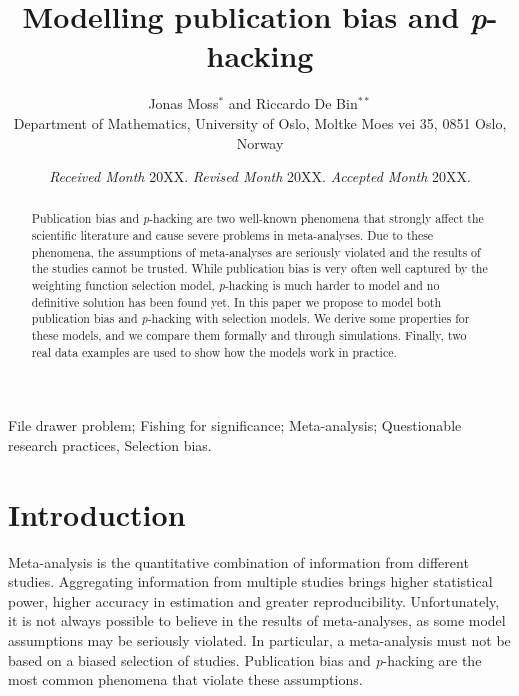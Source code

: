 \documentclass[useAMS,usenatbib,referee]{biom}
\author{Jonas Moss$^{*}$\email{jonasmgj@math.uio.no} and
Riccardo De Bin$^{**}$\email{debin@math.uio.no}\\
Department of Mathematics, University of Oslo, Moltke Moes vei 35, 0851 Oslo, Norway}
\title[Modelling publication bias and \textit{p}-hacking]{Modelling publication bias and \textit{p}-hacking}
\begin{document}
\date{{\it Received Month} 20XX. {\it Revised Month} 20XX.  {\it Accepted Month} 20XX.}

\pagerange{\pageref{firstpage}--\pageref{lastpage}} 


\label{firstpage}

\begin{abstract}
Publication bias and \textit{p}-hacking are two well-known phenomena that strongly affect the scientific literature and cause severe problems in meta-analyses. Due to these phenomena, the assumptions of meta-analyses are seriously violated and the results of the studies cannot be trusted. While publication bias is very often well captured by the weighting function selection model, \textit{p}-hacking is much harder to model and no definitive solution has been found yet. In this paper we propose to model both publication bias and \textit{p}-hacking with selection models. We derive some properties for these models, and we compare them formally and through simulations. Finally, two real data examples are used to show how the models work in practice.
\end{abstract}

\begin{keywords}
File drawer problem; Fishing for significance; Meta-analysis; Questionable research practices, Selection bias.
\end{keywords}

\maketitle

\section{Introduction}

Meta-analysis is the quantitative combination of information from different studies. Aggregating information from multiple studies brings higher statistical power, higher accuracy in estimation and greater reproducibility. Unfortunately, it is not always possible to believe in the results of meta-analyses, as some model assumptions may be seriously violated. In particular, a meta-analysis must not be based on a biased selection of studies. Publication bias \citep{sterling1959publication} and \textit{p}-hacking \citep{simmons2011false} are the most common phenomena that violate these assumptions. 
\end{document}
